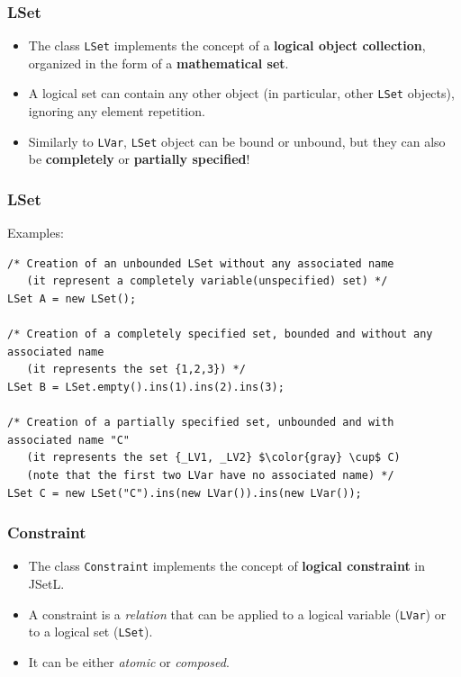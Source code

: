 \begin{frame}[fragile]
\frametitle{LSet}
\begin{itemize}
\setlength\itemsep{2em}
\item The class \texttt{LSet} implements the concept of a \textbf{logical object collection}, organized in the form of a \textbf{mathematical set}.\\
\item A logical set can contain any other object (in particular, other \texttt{LSet} objects), ignoring any element repetition.\\
\item Similarly to \texttt{LVar}, \texttt{LSet} object can be bound or unbound, but they can also be \textbf{completely} or \textbf{partially specified}!\\

\end{itemize}

\end{frame}

\begin{frame}[fragile]
\frametitle{LSet}
Examples:\\

\begin{lstlisting}[mathescape]
/* Creation of an unbounded LSet without any associated name
   (it represent a completely variable(unspecified) set) */
LSet A = new LSet();

/* Creation of a completely specified set, bounded and without any associated name
   (it represents the set {1,2,3}) */
LSet B = LSet.empty().ins(1).ins(2).ins(3);

/* Creation of a partially specified set, unbounded and with associated name "C"
   (it represents the set {_LV1, _LV2} $\color{gray} \cup$ C)
   (note that the first two LVar have no associated name) */
LSet C = new LSet("C").ins(new LVar()).ins(new LVar());
\end{lstlisting}

\end{frame}




\begin{frame}[fragile]
\frametitle{Constraint}
\begin{itemize}
\setlength\itemsep{2em}
\item The class \texttt{Constraint} implements the concept of \textbf{logical constraint} in JSetL.\\
\item A constraint is a \emph{relation} that can be applied to a logical variable (\texttt{LVar}) or to a logical set (\texttt{LSet}).\\
\item It can be either \emph{atomic} or \emph{composed}.\\
\end{itemize}
\end{frame}

